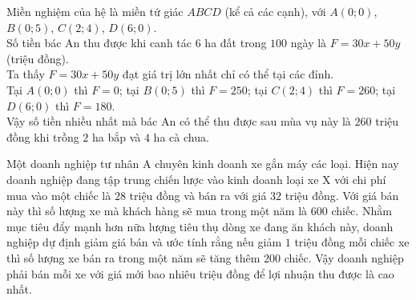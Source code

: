 \begin{ex}
{\begin{center}
		\end{center}
		Miền nghiệm của hệ là miền tứ giác $ABCD$ (kể cả các cạnh), với $A(0;0)$, $B(0;5)$, $C(2;4)$, $D(6;0)$.\\
		Số tiền bác An thu được khi canh tác $6$ ha đất trong $100$ ngày là $F=30x+50y$ (triệu đồng).\\
		Ta thấy $F=30x+50y$ đạt giá trị lớn nhất chỉ có thể tại các đỉnh.\\
		Tại $A(0;0)$ thì $F=0$; tại $B(0;5)$ thì $F=250$; tại $C(2;4)$ thì $F=260$; tại $D(6;0)$ thì $F=180$. \\
		Vậy số tiền nhiều nhất mà bác An có thể thu được sau mùa vụ này là $260$ triệu đồng khi trồng $2$ ha bắp và $4$ ha cà chua.
	}
\end{ex}

\begin{ex}%
		Một doanh nghiệp tư nhân A chuyên kinh doanh xe gắn máy các loại. Hiện nay doanh nghiệp đang tập trung chiến lược vào kinh doanh loại xe X với chi phí mua vào một chiếc là $28$ triệu đồng và bán ra với giá $32$ triệu đồng. Với giá bán này thì số lượng xe mà khách hàng sẽ mua trong một năm là $600$ chiếc. Nhằm mục tiêu đẩy mạnh hơn nữa lượng tiêu thụ dòng xe đang ăn khách này, doanh nghiệp dự định giảm giá bán và ước tính rằng nếu giảm $1$ triệu đồng mỗi chiếc xe thì số lượng xe bán ra trong một năm sẽ tăng thêm $200$ chiếc. Vậy doanh nghiệp phải bán mỗi xe với giá mới bao nhiêu triệu đồng để lợi nhuận thu được là cao nhất.
\end{ex}

